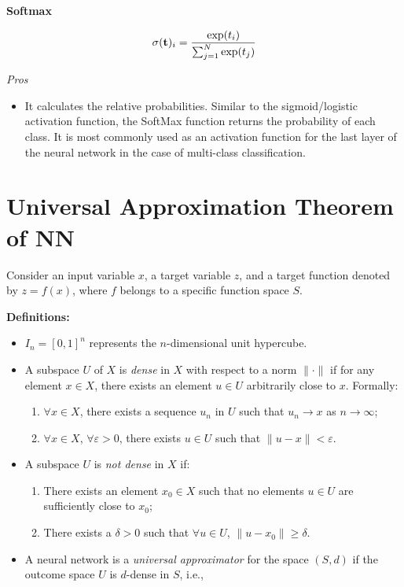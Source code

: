 \textbf{Softmax}

$$\sigma({\bf t})_i=\displaystyle \frac{\exp(t_i)}{\sum_{j=1}^N\exp(t_j)}$$

\textit{Pros}

\begin{itemize}
  \item It calculates the relative probabilities. Similar to the sigmoid/logistic activation
function, the SoftMax function returns the probability of each class.
It is most commonly used as an activation function for the last layer of the neural
network in the case of multi-class classification.
\end{itemize} 

\newpage

\section{Universal Approximation Theorem of NN}

Consider an input variable \(x\), a target variable \(z\), and a target function denoted by \(z = f(x)\), where \(f\) belongs to a specific function space \(S\).

\textbf{Definitions:}
\begin{itemize}
  \item \(I_n = [0,1]^n\) represents the \(n\)-dimensional unit hypercube.
  \item A subspace \(U\) of \(X\) is \textit{dense} in \(X\) with respect to a norm \(\|\cdot\|\) if for any element \(x \in X\), there exists an element \(u \in U\) arbitrarily close to \(x\). Formally:
  \begin{enumerate}
    \item \(\forall x \in X\), there exists a sequence \(u_n\) in \(U\) such that \(u_n \rightarrow x\) as \(n \rightarrow \infty\);
    \item \(\forall x \in X\), \(\forall \varepsilon > 0\), there exists \(u \in U\) such that \(\|u - x\| < \varepsilon\).
  \end{enumerate}
  \item A subspace \(U\) is \textit{not dense} in \(X\) if:
  \begin{enumerate}
    \item There exists an element \(x_0 \in X\) such that no elements \(u \in U\) are sufficiently close to \(x_0\);
    \item There exists a \(\delta > 0\) such that \(\forall u \in U\), \(\|u - x_0\| \geq \delta\).
  \end{enumerate}
  \item A neural network is a \textit{universal approximator} for the space \((S, d)\) if the outcome space \(U\) is \(d\)-dense in \(S\), i.e., 
\end{itemize}

